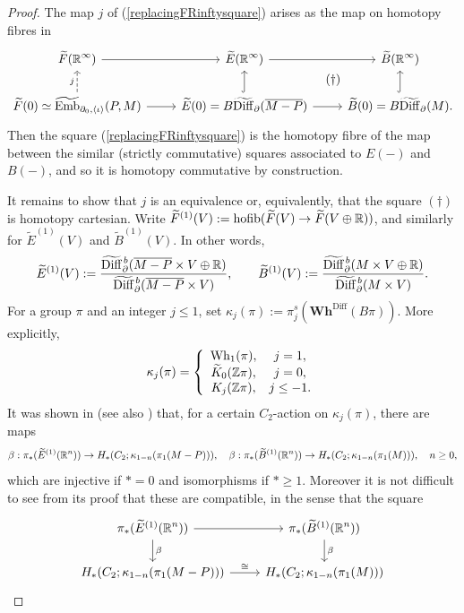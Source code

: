 \documentclass[a4paper, oneside]{amsart}
\newcommand{\diff}{\mathrm{Diff}}
\newcommand{\bdiff}{\widetilde{\mathrm{Diff}}}
\newcommand{\bemb}{\widetilde{\operatorname{Emb}}}
\newcommand{\hofib}{\operatorname{hofib}}
\newcommand{\1}{\mathds{1}}
\theoremstyle{remark}
\theoremstyle{definition}
\newcommand{\R}{{\scaleobj{0.97}{\mathbb{R}}}}
\newcommand{\Z}{{\scaleobj{0.97}{\mathbb{Z}}}}
\newcommand{\Wh}{\mathrm{Wh}}
\newcommand{\bdiffb}{\widetilde{\mathrm{Diff}}{\vphantom{\mathrm{Diff}}}^{\hspace{1pt}b}}
\newcommand{\Whsp}{\mathbf{Wh}^{\diff}}
\numberwithin{equation}{section}
\begin{document}
\begin{proof}
The map $j$ of (\ref{replacingFRinftysquare}) arises as the map on homotopy fibres in
    $$
\begin{tikzcd}
    \widetilde{F}(\R^\infty)\rar &\widetilde{E}(\R^\infty)\rar &\widetilde{B}(\R^\infty)\\
    \widetilde{F}(0)\simeq \bemb_{\partial_0,\langle\iota\rangle}(P,M)\uar[dashed, "j"]\rar &\widetilde{E}(0)=B\bdiff_{\partial}(\overline{M-P})\ar[ur, phantom, "(\dagger)"]\uar[hook]\rar &\widetilde{B}(0)=B\bdiff_{\partial}(M).\uar[hook]
\end{tikzcd}
    $$
Then the square (\ref{replacingFRinftysquare}) is the homotopy fibre of the map between the similar (strictly commutative) squares associated to $E(-)$ and $B(-)$, and so it is homotopy commutative by construction.

It remains to show that $j$ is an equivalence or, equivalently, that the square $(\dagger)$ is homotopy cartesian. Write $\widetilde{F}^{(1)}(V):=\hofib(\widetilde F(V)\to \widetilde F(V\oplus \R))$, and similarly for $\widetilde{E}^{(1)}(V)$ and $\widetilde{B}^{(1)}(V)$. In other words,
$$
\widetilde{E}^{(1)}(V):=\frac{\bdiffb_\partial(\overline{M-P}\times V\oplus \R)}{\bdiffb_\partial(\overline{M-P}\times V)}, \qquad \widetilde{B}^{(1)}(V):=\frac{\bdiffb_\partial(M\times V\oplus \R)}{\bdiffb_\partial(M\times V)}.
$$
For a group $\pi$ and an integer $j\leq 1$, set $\kappa_j(\pi):=\pi_j^s(\Whsp(B\pi))$. More explicitly,
\begin{equation}\label{kappagroups}
\kappa_j(\pi)=\left\{\begin{array}{cc}
    \Wh_1(\pi), & j=1, \\
    \widetilde{K}_0(\Z\pi), & j=0,\\
    K_j(\Z\pi), & j\leq -1.
\end{array}
\right.
\end{equation}
It was shown in \cite[Cor. 5.5]{WWI} (see also \cite{PedersenAnderson}) that, for a certain $C_2$-action on $\kappa_j(\pi)$, there are maps
$$
\beta:\pi_*(\widetilde{E}^{(1)}(\R^n))\to H_{*}(C_2; \kappa_{1-n}(\pi_1(M-P))), \quad \beta:\pi_*(\widetilde{B}^{(1)}(\R^n))\to H_{*}(C_2; \kappa_{1-n}(\pi_1(M))), \quad n\geq 0,
$$
which are injective if $*=0$ and isomorphisms if $*\geq 1$. Moreover it is not difficult to see from its proof that these are compatible, in the sense that the square
$$
\begin{tikzcd}
    \pi_*(\widetilde{E}^{(1)}(\R^n))\rar\dar["\beta"] & \pi_*(\widetilde{B}^{(1)}(\R^n))\dar["\beta"]\\
    H_{*}(C_2; \kappa_{1-n}(\pi_1(M-P)))\rar["\cong"] & H_{*}(C_2; \kappa_{1-n}(\pi_1(M)))

\end{tikzcd}$$
\end{proof}
\end{document}
